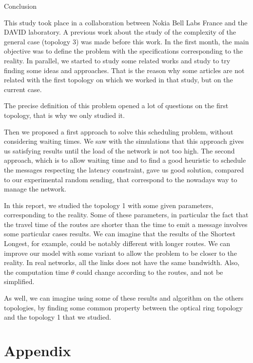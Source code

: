 \documentclass[a4paper,10pt]{report}
\begin{document}
\begin{chapter}{Conclusion}

This study took place in a collaboration between Nokia Bell Labs France and the DAVID laboratory.
A previous work about the study of the complexity of the general case (topology 3) was made before this work.
In the first month, the main objective was to define the problem with the specifications corresponding to the reality.
In parallel, we started to study some related works and study to try finding some ideas and approaches. That is the reason why some articles are not related
with the first topology on which we worked in that study, but on the current case.

The precise definition of this problem opened a lot of questions on the first topology, that is why we only studied it.

Then we proposed a first approach to solve this scheduling problem, without considering waiting times. We saw with the simulations 
that this approach gives us satisfying results until the load of the network is not too high.
The second approach, which is to allow waiting time and to find a good heuristic to schedule the messages respecting the latency constraint,
gave us good solution, compared to our experimental random sending, that correspond to the nowadays way to manage the network.

In this report, we studied the topology 1 with some given parameters, corresponding to the reality. Some of these parameters, in particular the fact that the travel time of the routes are shorter than the time to emit a message involves some particular cases results. We can imagine that the results of the Shortest Longest, for example, could be notably different with longer routes.
We can improve our model with some variant to allow the problem to be closer to the reality. In real networks, all the links does not have the same bandwidth. Also, the computation time $\theta$ could change according to the routes, and not be simplified.

As well, we can imagine using some of these results and algorithm on the others topologies, by finding some common property between the optical ring topology and the topology 1 that we studied.
\end{chapter}
\appendix

\chapter*{Appendix}
\end{document}
